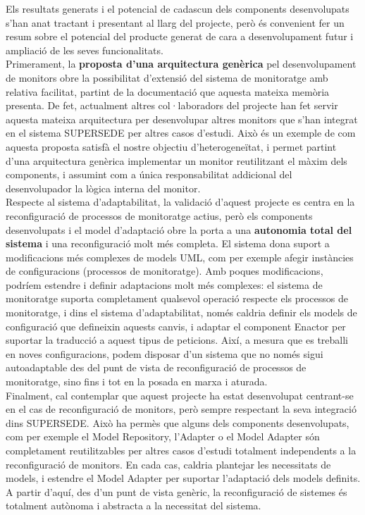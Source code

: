 Els resultats generats i el potencial de cadascun dels components desenvolupats s'han anat tractant i presentant al llarg del projecte, però és convenient fer un resum sobre el potencial del producte generat de cara a desenvolupament futur i ampliació de les seves funcionalitats.\\

Primerament, la \textbf{proposta d'una arquitectura genèrica} pel desenvolupament de monitors obre la possibilitat d'extensió del sistema de monitoratge amb relativa facilitat, partint de la documentació que aquesta mateixa memòria presenta. De fet, actualment altres col·laboradors del projecte han fet servir aquesta mateixa arquitectura per desenvolupar altres monitors que s'han integrat en el sistema SUPERSEDE per altres casos d'estudi. Això és un exemple de com aquesta proposta satisfà el nostre objectiu d'heterogeneïtat, i permet partint d'una arquitectura genèrica implementar un monitor reutilitzant el màxim dels components, i assumint com a única responsabilitat addicional del desenvolupador la lògica interna del monitor.\\

Respecte al sistema d'adaptabilitat, la validació d'aquest projecte es centra en la reconfiguració de processos de monitoratge actius, però els components desenvolupats i el model d'adaptació obre la porta a una \textbf{autonomia total del sistema} i una reconfiguració molt més completa. El sistema dona suport a modificacions més complexes de models UML, com per exemple afegir instàncies de configuracions (processos de monitoratge). Amb poques modificacions, podríem estendre i definir adaptacions molt més complexes: el sistema de monitoratge suporta completament qualsevol operació respecte els processos de monitoratge, i dins el sistema d'adaptabilitat, només caldria definir els models de configuració que defineixin aquests canvis, i adaptar el component Enactor per suportar la traducció a aquest tipus de peticions. Així, a mesura que es treballi en noves configuracions, podem disposar d'un sistema que no només sigui autoadaptable des del punt de vista de reconfiguració de processos de monitoratge, sino fins i tot en la posada en marxa i aturada.\\

Finalment, cal contemplar que aquest projecte ha estat desenvolupat centrant-se en el cas de reconfiguració de monitors, però sempre respectant la seva integració dins SUPERSEDE. Això ha permès que alguns dels components desenvolupats, com per exemple el Model Repository, l'Adapter o el Model Adapter són completament reutilitzables per altres casos d'estudi totalment independents a la reconfiguració de monitors. En cada cas, caldria plantejar les necessitats de models, i estendre el Model Adapter per suportar l'adaptació dels models definits. A partir d'aquí, des d'un punt de vista genèric, la reconfiguració de sistemes és totalment autònoma i abstracta a la necessitat del sistema.\\

